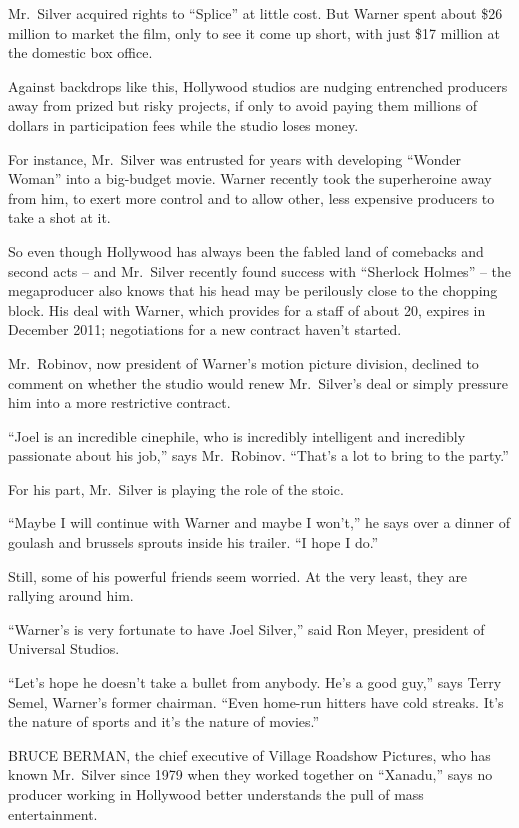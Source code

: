 ﻿\documentclass[12pt]{article}
\begin{document}
Mr.~Silver acquired rights to ``Splice'' at little cost. But Warner spent about \$26 million to
market the film, only to see it come up short, with just \$17 million at the domestic box office.

Against backdrops like this, Hollywood studios are nudging entrenched producers away from prized but
risky projects, if only to avoid paying them millions of dollars in participation fees while the
studio loses money.

For instance, Mr.~Silver was entrusted for years with developing ``Wonder Woman'' into a big-budget
movie. Warner recently took the superheroine away from him, to exert more control and to allow
other, less expensive producers to take a shot at it.

So even though Hollywood has always been the fabled land of comebacks and second acts -- and
Mr.~Silver recently found success with ``Sherlock Holmes'' -- the megaproducer also knows that his
head may be perilously close to the chopping block. His deal with Warner, which provides for a staff
of about 20, expires in December 2011; negotiations for a new contract haven't started.

Mr.~Robinov, now president of Warner's motion picture division, declined to comment on whether the
studio would renew Mr.~Silver's deal or simply pressure him into a more restrictive contract.

``Joel is an incredible cinephile, who is incredibly intelligent and incredibly passionate about his
job,'' says Mr.~Robinov. ``That's a lot to bring to the party.''

For his part, Mr.~Silver is playing the role of the stoic.

``Maybe I will continue with Warner and maybe I won't,'' he says over a dinner of goulash and
brussels sprouts inside his trailer. ``I hope I do.''

Still, some of his powerful friends seem worried. At the very least, they are rallying around him.

``Warner's is very fortunate to have Joel Silver,'' said Ron Meyer, president of Universal Studios.

``Let's hope he doesn't take a bullet from anybody. He's a good guy,'' says Terry Semel, Warner's
former chairman. ``Even home-run hitters have cold streaks. It's the nature of sports and it's the
nature of movies.''

BRUCE BERMAN, the chief executive of Village Roadshow Pictures, who has known Mr.~Silver since 1979
when they worked together on ``Xanadu,'' says no producer working in Hollywood better understands
the pull of mass entertainment.
\end{document}
